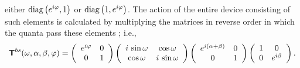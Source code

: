 {either
${\rm  diag}\left(
e^{i\varphi },1
\right)
$
or
${\rm  diag}
\left(
1,e^{i\varphi }
\right)
$.
 The action of the entire device consisting of such elements is
calculated by multiplying the matrices in reverse order in which the
quanta pass these elements \cite{yurke-86,teich:90}; i.e.,
\begin{equation}
\textsf{\textbf{T}}^{bs} (\omega ,\alpha ,\beta ,\varphi )=
\left(
\begin{array}{cc}
e^{i\varphi}& 0\\
0& 1
\end{array}
\right)
\left(
\begin{array}{cc}
i \, \sin \omega  & \cos \omega
\\
\cos \omega&  i\, \sin \omega
\end{array}
\right)
\left(
\begin{array}{cc}
e^{i(\alpha + \beta)}& 0\\
0& 1
\end{array}
\right)
\left(
\begin{array}{cc}
1&0\\
0& e^{i\beta }
\end{array}
\right).
\end{equation}

}
